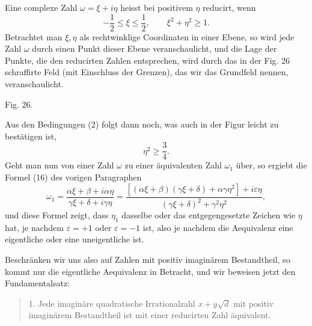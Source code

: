\documentclass[11pt]{article}
\begin{document}
Eine complexe Zahl $\omega=\xi+i\eta$ heisst bei positivem $\eta$ reducirt, wenn
\[
\tag{2}        -\frac12\le \xi\le \frac12,
        \qquad
        \xi^2+\eta^2\ge1.
\]
Betrachtet man $\xi,\eta$ als rechtwinklige Coordinaten in einer Ebene, so wird jede Zahl $\omega$ durch einen Punkt dieser Ebene veranschaulicht, und die Lage der Punkte, die den reducirten Zahlen entsprechen, wird durch das in der Fig. 26 schraffirte Feld (mit Einschluss der Grenzen), das wir das Grundfeld nennen, veranschaulicht.

\begin{center}

{\small Fig. 26.}
\end{center}

Aus den Bedingungen (2) folgt dann noch, was auch in der Figur leicht zu bestätigen ist,
\[
\tag{3}        \eta^2\ge\frac34.
\]
Geht man nun von einer Zahl $\omega$ zu einer äquivalenten Zahl $\omega_1$ über, so ergiebt die Formel (16) des vorigen Paragraphen
\[
\tag{4}
\omega_1=\frac{\alpha\xi+\beta+i\alpha\eta}{\gamma\xi+\delta+i\gamma\eta}
=\frac{[(\alpha\xi+\beta)(\gamma\xi+\delta)+\alpha\gamma\eta^2]+i\varepsilon\eta}
       {(\gamma\xi+\delta)^2+\gamma^2\eta^2},
\]
und diese Formel zeigt, dass $\eta_1$ dasselbe oder das entgegengesetzte Zeichen wie $\eta$ hat, je nachdem $\varepsilon=+1$ oder $\varepsilon=-1$ ist, also je nachdem die Aequivalenz eine eigentliche oder eine uneigentliche ist.

Beschränken wir uns also auf Zahlen mit positiv imaginärem Bestandtheil, so kommt nur die eigentliche Aequivalenz in Betracht, und wir beweisen jetzt den Fundamentalsatz:
\begin{quote}
1. Jede imaginäre quadratische Irrationalzahl $x+y\sqrt d$ mit positiv imaginärem Bestandtheil ist mit einer reducirten Zahl äquivalent.
\end{quote}
\end{document}
